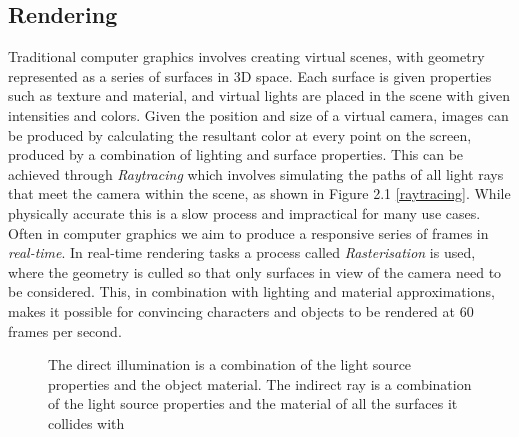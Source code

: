 \documentclass[ %
                    author={Gavin Parker},
                supervisor={Dr. Neill Campbell},
                    degree={MEng},
                     title={Deep Learning for Illumination Estimation from Stereo Images},
                  subtitle={},
                      type={Research},
                      year={2018} ]{dissertation}
\begin{document}
\subsection{Rendering}
Traditional computer graphics involves creating virtual scenes, with geometry represented as a series of surfaces in 3D space. Each surface is given properties such as texture and material, and virtual lights are placed in the scene with given intensities and colors. Given the position and size of a virtual camera, images can be produced by calculating the resultant color at every point on the screen, produced by a combination of lighting and surface properties. This can be achieved through \textit{Raytracing} which involves simulating the paths of all light rays that meet the camera within the scene, as shown in Figure 2.1 \ref{raytracing}. While physically accurate this is a slow process and impractical for many use cases. Often in computer graphics we aim to produce a responsive series of frames in \textit{real-time}. In real-time rendering tasks a process called \textit{Rasterisation} is used, where the geometry is culled so that only surfaces in view of the camera need to be considered. This, in combination with lighting and material approximations, makes it possible for convincing characters and objects to be rendered at 60 frames per second.
\newpage
\begin{center}
\begin{figure}[H]
\centering
{}
\label{fig:raytracing}
\caption{The direct illumination is a combination of the light source properties and the object material. The indirect ray is a combination of the light source properties and the material of all the surfaces it collides with}
\end{figure}
\end{center}
\end{document}
